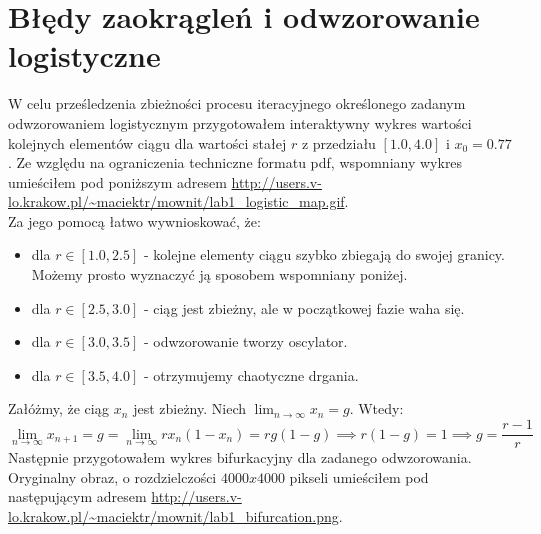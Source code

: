 \documentclass{article}
\begin{document}
    \section{Błędy zaokrągleń i odwzorowanie logistyczne}
        W celu prześledzenia zbieżności procesu iteracyjnego określonego zadanym odwzorowaniem logistycznym przygotowałem interaktywny wykres wartości kolejnych elementów ciągu dla wartości stałej $r$ z przedziału $[1.0, 4.0]$ i $x_0 = 0.77$. Ze względu na ograniczenia techniczne formatu pdf, wspomniany wykres umieściłem pod poniższym adresem \url{http://users.v-lo.krakow.pl/~maciektr/mownit/lab1_logistic_map.gif}.\\
        Za jego pomocą łatwo wywnioskować, że:
        \begin{itemize}
            \item dla $r\in[1.0,2.5]$ - kolejne elementy ciągu szybko zbiegają do swojej granicy. Możemy prosto wyznaczyć ją sposobem wspomniany poniżej.
            \item dla $r\in[2.5,3.0]$ - ciąg jest zbieżny, ale w początkowej fazie waha się. 
            \item dla $r\in[3.0,3.5]$ - odwzorowanie tworzy oscylator.
            \item dla $r\in[3.5,4.0]$ - otrzymujemy chaotyczne drgania. 
        \end{itemize}
        Załóżmy, że ciąg $x_n$ jest zbieżny. Niech $\lim_{n\to\infty} x_n=g$. Wtedy: 
        $$\lim_{n\to\infty} x_{n+1}=g=\lim_{n\to\infty} rx_n(1-x_n)=rg(1-g)\implies r(1-g)=1 \implies g=\frac{r-1}{r}$$
        Następnie przygotowałem wykres bifurkacyjny dla zadanego odwzorowania. Oryginalny obraz, o rozdzielczości $4000x4000$ pikseli umieściłem pod następującym adresem \url{http://users.v-lo.krakow.pl/~maciektr/mownit/lab1_bifurcation.png}.
\end{document}
